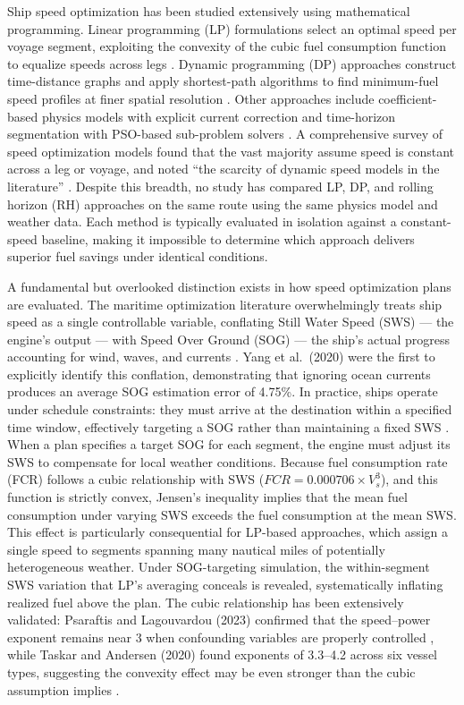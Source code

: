 \documentclass[review]{elsarticle}
\begin{document}
Ship speed optimization has been studied extensively using mathematical programming. Linear programming (LP) formulations select an optimal speed per voyage segment, exploiting the convexity of the cubic fuel consumption function to equalize speeds across legs \cite{Fagerholt2010,Norstad2011}. Dynamic programming (DP) approaches construct time-distance graphs and apply shortest-path algorithms to find minimum-fuel speed profiles at finer spatial resolution \cite{Zaccone2018}. Other approaches include coefficient-based physics models with explicit current correction \cite{Yang2020} and time-horizon segmentation with PSO-based sub-problem solvers \cite{Tzortzis2021}. A comprehensive survey of speed optimization models found that the vast majority assume speed is constant across a leg or voyage, and noted ``the scarcity of dynamic speed models in the literature'' \cite{Psaraftis2013}. Despite this breadth, no study has compared LP, DP, and rolling horizon (RH) approaches on the same route using the same physics model and weather data. Each method is typically evaluated in isolation against a constant-speed baseline, making it impossible to determine which approach delivers superior fuel savings under identical conditions.

A fundamental but overlooked distinction exists in how speed optimization plans are evaluated. The maritime optimization literature overwhelmingly treats ship speed as a single controllable variable, conflating Still Water Speed (SWS) --- the engine's output --- with Speed Over Ground (SOG) --- the ship's actual progress accounting for wind, waves, and currents \cite{Yang2020}. Yang et al.\ (2020) were the first to explicitly identify this conflation, demonstrating that ignoring ocean currents produces an average SOG estimation error of 4.75\%. In practice, ships operate under schedule constraints: they must arrive at the destination within a specified time window, effectively targeting a SOG rather than maintaining a fixed SWS \cite{Jia2017,Huotari2021}. When a plan specifies a target SOG for each segment, the engine must adjust its SWS to compensate for local weather conditions. Because fuel consumption rate (FCR) follows a cubic relationship with SWS ($FCR = 0.000706 \times V_s^3$), and this function is strictly convex, Jensen's inequality implies that the mean fuel consumption under varying SWS exceeds the fuel consumption at the mean SWS. This effect is particularly consequential for LP-based approaches, which assign a single speed to segments spanning many nautical miles of potentially heterogeneous weather. Under SOG-targeting simulation, the within-segment SWS variation that LP's averaging conceals is revealed, systematically inflating realized fuel above the plan. The cubic relationship has been extensively validated: Psaraftis and Lagouvardou (2023) confirmed that the speed--power exponent remains near 3 when confounding variables are properly controlled \cite{Psaraftis2023}, while Taskar and Andersen (2020) found exponents of 3.3--4.2 across six vessel types, suggesting the convexity effect may be even stronger than the cubic assumption implies \cite{Taskar2020}.
\end{document}

